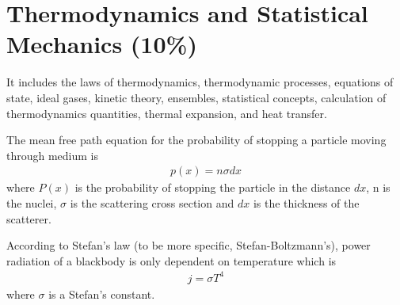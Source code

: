 
\section{Thermodynamics and Statistical Mechanics (10\%)}

It includes the laws of thermodynamics, thermodynamic processes, equations of state, ideal gases, kinetic theory, ensembles, statistical concepts, calculation of thermodynamics quantities, thermal expansion, and heat transfer.


The mean free path equation for the probability of stopping a particle moving through medium is
\begin{align}
p(x) = n \sigma dx
\end{align}
where $P(x)$ is the probability of stopping the particle in the distance $dx$, n is the nuclei, $\sigma$ is the scattering cross section and $dx$ is the thickness of the scatterer.

According to Stefan's law (to be more specific, Stefan-Boltzmann's), power radiation of a blackbody is only dependent on temperature which is
\begin{align}
j = \sigma T^{4}
\end{align}
where $\sigma$ is a Stefan's constant.